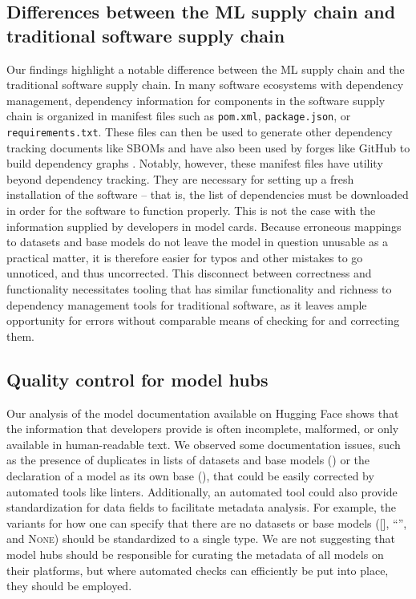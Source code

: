 \subsection{Differences between the ML supply chain and traditional software supply chain}
Our findings highlight a notable difference between the ML supply chain and the traditional software supply chain.
In many software ecosystems with dependency management, dependency information for components in the software supply chain is organized in manifest files such as \texttt{pom.xml}, \texttt{package.json}, or \texttt{requirements.txt}.
These files can then be used to generate other dependency tracking documents like SBOMs and have also been used by forges like GitHub to build dependency graphs \cite{dep_graph}.  Notably, however, these manifest files have utility %
beyond dependency tracking.  They are necessary for setting up a fresh installation of the software -- that is, the list of dependencies must be downloaded in order for the software to function properly.  This is not the case with the information supplied by developers in model cards.  Because erroneous mappings to datasets and base models do not leave the model in question unusable as a practical matter, it is therefore easier for typos and other mistakes to go unnoticed, and thus uncorrected.
This disconnect between correctness and functionality necessitates tooling that has similar functionality and richness to dependency management tools for traditional software, as it leaves ample opportunity for errors without comparable means of checking for and correcting them.



\subsection{Quality control for model hubs}
Our analysis of the model documentation available on Hugging Face shows that the information that developers provide is often incomplete, malformed, or only available in human-readable text. We observed some documentation issues, such as the presence of duplicates in lists of datasets and base models () or the declaration of a model as its own base (), that could be easily corrected by automated tools like linters. Additionally, an automated tool could also provide standardization for data fields to facilitate metadata analysis.  For example, the variants for how one can specify that there are no datasets or base models ([], ``'', and \textsc{None}) should be standardized to a single type.  We are not suggesting that model hubs should be responsible for curating the metadata of all models on their platforms, but where automated checks can efficiently be put into place, they should be employed. 

